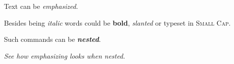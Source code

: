 \documentclass{article}
\begin{document}
{\sffamily
Text can be {\em emphasized}.

Besides being {\itshape italic} words could be {\bfseries bold},
{\slshape slanted} or typeset in {\scshape Small Cap}.

Such commands can be {\itshape\bfseries nested}.}

{\em See how {\em emphasizing} looks when nested.}
\end{document}
